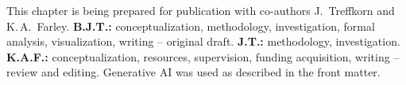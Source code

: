 \begin{chaptercredit}
This chapter is being prepared for publication with co-authors J.\ Treffkorn and K.\,A.\ Farley.
\textbf{B.J.T.:} conceptualization, methodology, investigation, formal analysis, visualization, writing -- original draft.
\textbf{J.T.:} methodology, investigation.
\textbf{K.A.F.:} conceptualization, resources, supervision, funding acquisition,
writing -- review and editing.
Generative AI was used as described in the front matter.
\end{chaptercredit}
